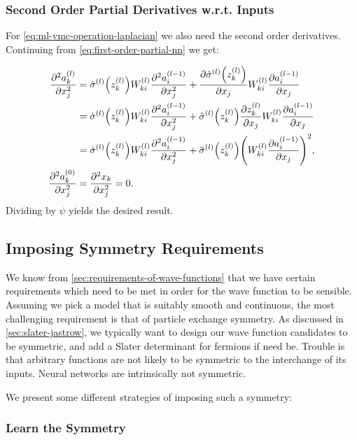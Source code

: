 \documentclass[Thesis.tex]{subfiles}
\begin{document}
\subsubsection{Second Order Partial Derivatives w.r.t. Inputs}

For \cref{eq:ml-vmc-operation-laplacian} we also need the second order
derivatives. Continuing from \cref{eq:first-order-partial-nn} we get:

\begin{align}
  \pdv[2]{a_k^{(l)}}{x_j} &= \dot\sigma^{(l)}\qty(z_k^{(l)})W_{ki}^{(l)}\pdv[2]{a_i^{(l-1)}}{x_j} + \pdv{\dot\sigma^{(l)}\qty(z_k^{(l)})}{x_j}W_{ki}^{(l)}\pdv{a_i^{(l-1)}}{x_j}\\
  &= \dot\sigma^{(l)}\qty(z_k^{(l)})W_{ki}^{(l)}\pdv[2]{a_i^{(l-1)}}{x_j} + \ddot\sigma^{(l)}\qty(z_k^{(l)})\pdv{z_k^{(l)}}{x_j}W_{ki}^{(l)}\pdv{a_i^{(l-1)}}{x_j}\\
                          &= \dot\sigma^{(l)}\qty(z_k^{(l)})W_{ki}^{(l)}\pdv[2]{a_i^{(l-1)}}{x_j} + \ddot\sigma^{(l)}\qty(z_k^{(l)})\qty(W_{ki}^{(l)}\pdv{a_i^{(l-1)}}{x_j})^2,\\
                            \pdv[2]{a_k^{(0)}}{x_j} &= \pdv[2]{x_k}{x_j} = 0.
\end{align}
Dividing by $\psi$ yields the desired result.


\subsection{Imposing Symmetry Requirements}

We know from \cref{sec:requirements-of-wave-functions} that we have certain
requirements which need to be met in order for the wave function to be sensible.
Assuming we pick a model that is suitably smooth and continuous, the most
challenging requirement is that of particle exchange symmetry. As discussed in
\cref{sec:slater-jastrow}, we typically want to design our wave function
candidates to be symmetric, and add a Slater determinant for fermions if need
be. Trouble is that arbitrary functions are not likely to be symmetric to the
interchange of its inputs. Neural networks are intrinsically not symmetric.

We present some different strategies of imposing such a symmetry:

\subsubsection{Learn the Symmetry}
\end{document}
